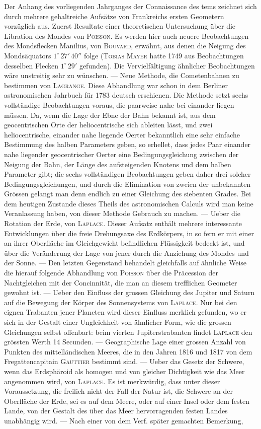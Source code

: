 Der Anhang des vorliegenden Jahrganges der Connaissance des tems zeichnet sich durch mehrere gehaltreiche Aufsätze von Frankreichs ersten Geometern vorzüglich aus. Zuerst Resultate einer theoretischen Untersuchung über die Libration des Mondes von \textsc{Poisson}. Es werden hier auch neuere Beobachtungen des Mondsflecken Manilius, von \textsc{Bouvard}, erwähnt, aus denen die Neigung des Mondsäquators $1^\circ\,27'\,40''$ folge (\textsc{Tobias Mayer} hatte 1749 aus Beobachtungen desselben Flecken $1^\circ\,29'$ gefunden). Die Vervielfältigung ähnlicher Beobachtungen wäre unstreitig sehr zu wünschen. --- Neue Methode, die Cometenbahnen zu bestimmen von \textsc{Lagrange}. Diese Abhandlung war schon in dem Berliner astronomischen Jahrbuch für 1783 deutsch erschienen. Die Methode setzt sechs vollständige Beobachtungen voraus, die paarweise nahe bei einander liegen müssen. Da, wenn die Lage der Ebne der Bahn bekannt ist, aus dem geocentrischen Orte der heliocentrische sich ableiten lässt, und zwei heliocentrische, einander nahe liegende Oerter bekanntlich eine sehr einfache Bestimmung des halben Parameters geben, so erhellet, dass jedes Paar einander nahe liegender geocentrischer Oerter eine Bedingungsgleichung zwischen der Neigung der Bahn, der Länge des aufsteigenden Knotens und dem halben Parameter gibt; die sechs vollständigen Beobachtungen geben daher drei solcher Bedingungsgleichungen, und durch die Elimination von zweien der unbekannten Grössen gelangt man denn endlich zu einer Gleichung des siebenten Grades. Bei dem heutigen Zustande dieses Theils des astronomischen Calculs wird man keine Veranlassung haben, von dieser Methode Gebrauch zu machen. --- Ueber die Rotation der Erde, von \textsc{Laplace}. Dieser Aufsatz enthält mehrere interessante Entwicklungen über die freie Drehungsaxe des Erdkörpers, in so fern er mit einer an ihrer Oberfläche im Gleichgewicht befindlichen Flüssigkeit bedeckt ist, und über die Veränderung der Lage von jener durch die Anziehung des Mondes und der Sonne. --- Den letzten Gegenstand behandelt gleichfalls auf ähnliche Weise die hierauf folgende Abhandlung von \textsc{Poisson} über die Präcession der Nachtgleichen mit der Concinnität, die man an diesem trefflichen Geometer gewohnt ist. --- Ueber den Einfluss der grossen Gleichung des Jupiter und Saturn auf die Bewegung der Körper des Sonnensystems von \textsc{Laplace}. Nur bei den eignen Trabanten jener Planeten wird dieser Einfluss merklich gefunden, wo er sich in der Gestalt einer Ungleichheit von ähnlicher Form, wie die grossen Gleichungen selbst offenbart: beim vierten Jupiterstrabanten findet \textsc{Laplace} den grössten Werth 14 Secunden. --- Geographische Lage einer grossen Anzahl von Punkten des mittelländischen Meeres, die in den Jahren 1816 und 1817 von dem Fregattencapitain \textsc{Gauttier} bestimmt sind. --- Ueber das Gesetz der Schwere, wenn das Erdsphäroid als homogen und von gleicher Dichtigkeit wie das Meer angenommen wird, von \textsc{Laplace}. Es ist merkwürdig, dass unter dieser Voraussetzung, die freilich nicht der Fall der Natur ist, die Schwere an der Oberfläche der Erde, sei es auf dem Meere, oder auf einer Insel oder dem festen Lande, von der Gestalt des über das Meer hervorragenden festen Landes unabhängig wird. --- Nach einer von dem Verf. später gemachten Bemerkung, 